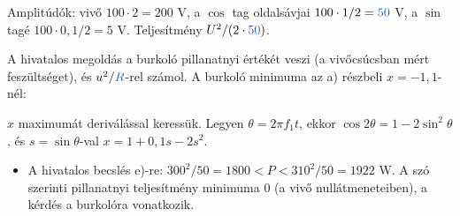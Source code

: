 Amplitúdók: vivő $100\cdot2=200$ V, a $\cos$ tag oldalsávjai $100\cdot1/2={\ca{50}}$ V, a $\sin$ tagé $100\cdot0{,}1/2=5$ V. Teljesítmény $U^2/(2\cdot{\ca{50}})$.

\begin{center}\end{center}



\begin{center}\end{center}

A hivatalos megoldás a burkoló pillanatnyi értékét veszi (a vivőcsúcsban mért feszültséget), és $u^2/{\ca{R}}$-rel számol. A burkoló minimuma az a) részbeli $x=-1{,}1$-nél:

\begin{center}\end{center}

$x$ maximumát deriválással keressük. Legyen $\theta=2\pi f_1t$, ekkor $\cos2\theta=1-2\sin^2\theta$, és $s=\sin\theta$-val $x=1+0{,}1s-2s^2$.

\begin{center}\end{center}

\begin{center}\end{center}
\begin{eredmeny}

\begin{center}\end{center}
\end{eredmeny}
\begin{tipp}[Ellenőrzés]
\begin{itemize}
\item A hivatalos becslés e)-re: $300^2/50=1800<P<310^2/50=1922$ W. A szó szerinti pillanatnyi teljesítmény minimuma 0 (a vivő nullátmeneteiben), a kérdés a burkolóra vonatkozik.
\end{itemize}
\end{tipp}


